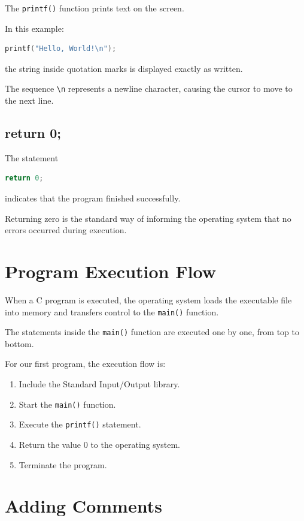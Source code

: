 \documentclass[12pt,openany]{book}
\begin{document}
The \texttt{printf()} function prints text on the screen.

In this example:

\begin{lstlisting}[language=C]
printf("Hello, World!\n");
\end{lstlisting}

the string inside quotation marks is displayed exactly as written.

The sequence \texttt{\textbackslash n} represents a newline character, causing the cursor to move to the next line.

\subsection{return 0;}

The statement

\begin{lstlisting}[language=C]
return 0;
\end{lstlisting}

indicates that the program finished successfully.

Returning zero is the standard way of informing the operating system that no errors occurred during execution.
\section{Program Execution Flow}

When a C program is executed, the operating system loads the executable file into memory and transfers control to the \texttt{main()} function.

The statements inside the \texttt{main()} function are executed one by one, from top to bottom.

For our first program, the execution flow is:

\begin{enumerate}
    \item Include the Standard Input/Output library.
    \item Start the \texttt{main()} function.
    \item Execute the \texttt{printf()} statement.
    \item Return the value 0 to the operating system.
    \item Terminate the program.
\end{enumerate}

\section{Adding Comments}
\end{document}
